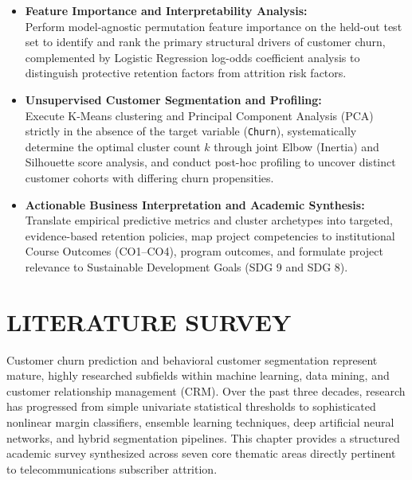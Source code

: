 \documentclass[12pt,a4paper]{report}
\begin{document}
\begin{itemize}
    \item[\textbf{Objective 4:}] \textbf{Feature Importance and Interpretability Analysis:}\\
    Perform model-agnostic permutation feature importance on the held-out test set to identify and rank the primary structural drivers of customer churn, complemented by Logistic Regression log-odds coefficient analysis to distinguish protective retention factors from attrition risk factors.

    \item[\textbf{Objective 5:}] \textbf{Unsupervised Customer Segmentation and Profiling:}\\
    Execute K-Means clustering and Principal Component Analysis (PCA) strictly in the absence of the target variable (\texttt{Churn}), systematically determine the optimal cluster count $k$ through joint Elbow (Inertia) and Silhouette score analysis, and conduct post-hoc profiling to uncover distinct customer cohorts with differing churn propensities.

    \item[\textbf{Objective 6:}] \textbf{Actionable Business Interpretation and Academic Synthesis:}\\
    Translate empirical predictive metrics and cluster archetypes into targeted, evidence-based retention policies, map project competencies to institutional Course Outcomes (CO1--CO4), program outcomes, and formulate project relevance to Sustainable Development Goals (SDG 9 and SDG 8).
\end{itemize}

\chapter{LITERATURE SURVEY}

Customer churn prediction and behavioral customer segmentation represent mature, highly researched subfields within machine learning, data mining, and customer relationship management (CRM). Over the past three decades, research has progressed from simple univariate statistical thresholds to sophisticated nonlinear margin classifiers, ensemble learning techniques, deep artificial neural networks, and hybrid segmentation pipelines. This chapter provides a structured academic survey synthesized across seven core thematic areas directly pertinent to telecommunications subscriber attrition.
\end{document}
